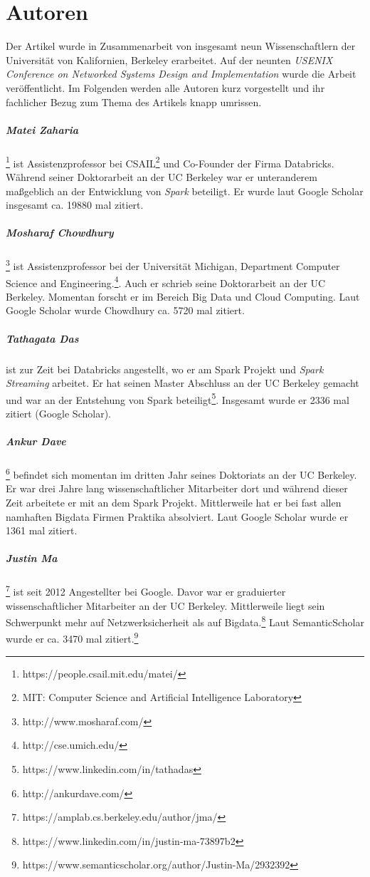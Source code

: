 \section{Autoren}

Der Artikel wurde in Zusammenarbeit von insgesamt neun Wissenschaftlern der Universität von Kalifornien, Berkeley erarbeitet. Auf der neunten \textit{USENIX Conference on Networked Systems Design and Implementation} wurde die Arbeit veröffentlicht. Im Folgenden werden alle Autoren kurz vorgestellt und ihr fachlicher Bezug zum Thema des Artikels knapp umrissen.

\subparagraph{Matei Zaharia} \footnote{https://people.csail.mit.edu/matei/} ist Assistenzprofessor bei CSAIL\footnote{MIT: Computer Science and Artificial Intelligence Laboratory} und Co-Founder der Firma Databricks. Während seiner Doktorarbeit an der UC Berkeley war er unteranderem maßgeblich an der Entwicklung von \textit{Spark} beteiligt. Er wurde laut Google Scholar insgesamt ca. 19880 mal zitiert.

\subparagraph{Mosharaf Chowdhury} \footnote{http://www.mosharaf.com/} ist Assistenzprofessor bei der Universität Michigan, Department Computer Science and Engineering.\footnote{http://cse.umich.edu/}. Auch er schrieb seine Doktorarbeit an der UC Berkeley. Momentan forscht er im Bereich Big Data und Cloud Computing. Laut Google Scholar wurde Chowdhury ca. 5720 mal zitiert.


\subparagraph{Tathagata Das}  ist zur Zeit bei Databricks angestellt, wo er am Spark Projekt und \textit{Spark Streaming} arbeitet. Er hat seinen Master Abschluss an der UC Berkeley gemacht und war an der Entstehung von Spark beteiligt\footnote{https://www.linkedin.com/in/tathadas}. Insgesamt wurde er 2336 mal zitiert (Google Scholar).


\subparagraph{Ankur Dave} \footnote{http://ankurdave.com/} befindet sich momentan im dritten Jahr seines Doktoriats an der UC Berkeley. Er war drei Jahre lang wissenschaftlicher Mitarbeiter dort und während dieser Zeit arbeitete er mit an dem Spark Projekt. Mittlerweile hat er bei fast allen namhaften Bigdata Firmen Praktika absolviert. Laut Google Scholar wurde er 1361 mal zitiert. 


\subparagraph{Justin Ma} \footnote{https://amplab.cs.berkeley.edu/author/jma/} ist seit 2012 Angestellter bei Google. Davor war er graduierter wissenschaftlicher Mitarbeiter an der UC Berkeley. Mittlerweile liegt sein Schwerpunkt mehr auf Netzwerksicherheit als auf Bigdata.\footnote{https://www.linkedin.com/in/justin-ma-73897b2} Laut SemanticScholar wurde er ca. 3470 mal zitiert.\footnote{https://www.semanticscholar.org/author/Justin-Ma/2932392}


